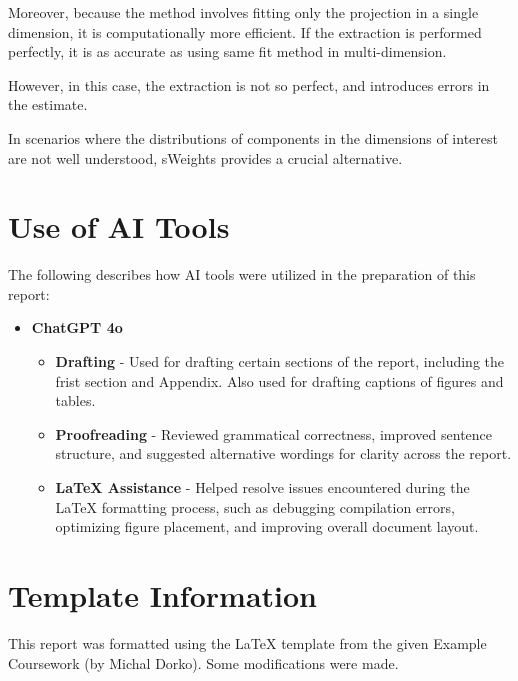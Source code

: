 \documentclass{article}
\begin{document}
Moreover, because the method involves fitting only the projection in a single dimension, it is computationally more efficient. If the extraction is performed perfectly, it is as accurate as using same fit method in multi-dimension.

However, in this case, the extraction is not so perfect, and introduces errors in the estimate. 

In scenarios where the distributions of components in the dimensions of interest are not well understood, sWeights provides a crucial alternative.



\clearpage
\newpage
\appendix
\section{Use of AI Tools}
The following describes how AI tools were utilized in the preparation of this report:
\begin{itemize}
    \item \textbf{ChatGPT 4o}
        \begin{itemize}
            \item \textbf{Drafting} - Used for drafting certain sections of the report, including the frist section and Appendix. Also used for drafting captions of figures and tables.
            \item \textbf{Proofreading} - Reviewed grammatical correctness, improved sentence structure, and suggested alternative wordings for clarity across the report.
            \item \textbf{LaTeX Assistance} - Helped resolve issues encountered during the LaTeX formatting process, such as debugging compilation errors, optimizing figure placement, and improving overall document layout.
        \end{itemize}
\end{itemize}


\section{Template Information}
This report was formatted using the LaTeX template from the given Example Coursework (by Michal Dorko). Some modifications were made.

\newpage
\printbibliography
\end{document}
